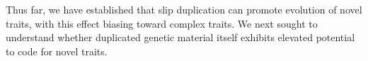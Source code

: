 


Thus far, we have established that slip duplication can promote evolution of novel traits, with this effect biasing toward complex traits.
We next sought to understand whether duplicated genetic material itself exhibits elevated potential to code for novel traits.


